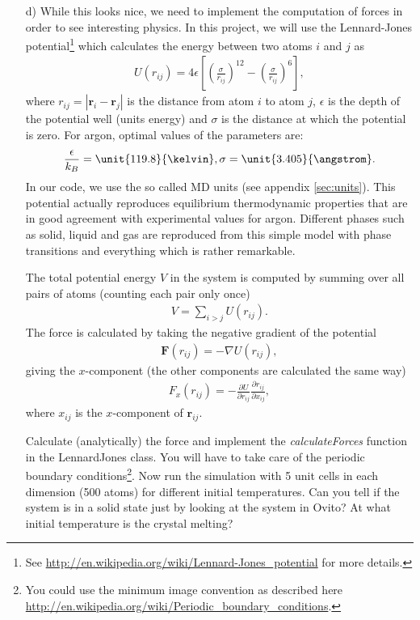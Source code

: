 \documentclass[a4wide,12pt]{article}
\renewcommand{\vec}{\mathbf}
\begin{document}
\begin{enumerate}
\item[d)]
While this looks nice, we need to implement the computation of forces in order to see interesting physics. In this project, we will use the Lennard-Jones potential\footnote{See \url{http://en.wikipedia.org/wiki/Lennard-Jones_potential} for more details.} which calculates the energy between two atoms $i$ and $j$ as
\begin{align}
	U(r_{ij}) = 4\epsilon\left[\left(\frac{\sigma}{r_{ij}}\right)^{12} - \left(\frac{\sigma}{r_{ij}}\right)^6\right],
\end{align}
where $r_{ij} = |\vec r_i - \vec r_j|$ is the distance from atom $i$ to atom $j$, $\epsilon$ is the depth of the potential well (units energy) and $\sigma$ is the distance at which the potential is zero. For argon, optimal values of the parameters are:
\begin{align}
	\frac{\epsilon}{k_B} = \unit{119.8}{\kelvin}, \sigma=\unit{3.405}{\angstrom}.
\end{align}
In our code, we use the so called MD units (see appendix \ref{sec:units}). This potential actually reproduces equilibrium thermodynamic properties that are in good agreement with experimental values for argon. Different phases such as solid, liquid and gas are reproduced from this simple model with phase transitions and everything which is rather remarkable.

The total potential energy $V$ in the system is computed by summing over all pairs of atoms (counting each pair only once)
\begin{align}
	V = \sum_{i>j} U(r_{ij}).
\end{align}
The force is calculated by taking the negative gradient of the potential
\begin{align}
	\vec F(r_{ij}) = -\nabla U(r_{ij}),
\end{align}
giving the $x$-component (the other components are calculated the same way)
\begin{align}
	F_x(r_{ij}) = -\frac{\partial U}{\partial r_{ij}}\frac{\partial r_{ij}}{\partial x_{ij}},
\end{align}
where $x_{ij}$ is the $x$-component of $\vec r_{ij}$.

Calculate (analytically) the force and implement the \textit{calculateForces} function in the LennardJones class. You will have to take care of the periodic boundary conditions\footnote{You could use the minimum image convention as described here \url{http://en.wikipedia.org/wiki/Periodic_boundary_conditions}.}. Now run the simulation with 5 unit cells in each dimension (500 atoms) for different initial temperatures. Can you tell if the system is in a solid state just by looking at the system in Ovito? At what initial temperature is the crystal melting?


\end{enumerate}
\end{document}
